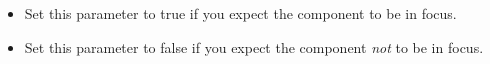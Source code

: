 
\begin{itemize}
\item Set this parameter to true if you expect the component to be in focus.
\item Set this parameter to false if you expect the component \emph{not} to be in focus.
\end{itemize}
